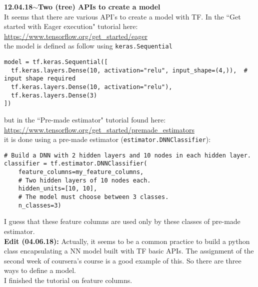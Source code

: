 \documentclass[11pt,a4paper]{article}
\newenvironment{loggentry}[2]%
{\noindent\textbf{#1}\hspace{1cm}$\mathbf{\sim}$\text{ }\textbf{#2}\\}{\vspace{0.5cm}}
\begin{document}
\begin{loggentry}{12.04.18}{Two (tree) APIs to create a model}
It seems that there are various API's to create a model with TF. In the ``Get started with Eager execution" tutorial here:\\
\url{https://www.tensorflow.org/get_started/eager}\\
the model is defined as follow using \texttt{keras.Sequential}\\
\begin{verbatim}
model = tf.keras.Sequential([
  tf.keras.layers.Dense(10, activation="relu", input_shape=(4,)),  # input shape required
  tf.keras.layers.Dense(10, activation="relu"),
  tf.keras.layers.Dense(3)
])
\end{verbatim}
but in the ``Pre-made estimator" tutorial found here:\\
\url{https://www.tensorflow.org/get_started/premade_estimators}\\
it is done using a pre-made estimator (\texttt{estimator.DNNClassifier}):
\begin{verbatim}
# Build a DNN with 2 hidden layers and 10 nodes in each hidden layer.
classifier = tf.estimator.DNNClassifier(
    feature_columns=my_feature_columns,
    # Two hidden layers of 10 nodes each.
    hidden_units=[10, 10],
    # The model must choose between 3 classes.
    n_classes=3)
\end{verbatim}
I guess that these feature columns are used only by these classes of pre-made estimator.\\
\textbf{Edit (04.06.18):} Actually, it seems to be a common practice to build a python class encapsulating a NN model built with TF basic APIs. The assignment of the second week of coursera's course is a good example of this. So there are three ways to define a model.\\

I finished the tutorial on feature columns.
\end{loggentry}
\end{document}
